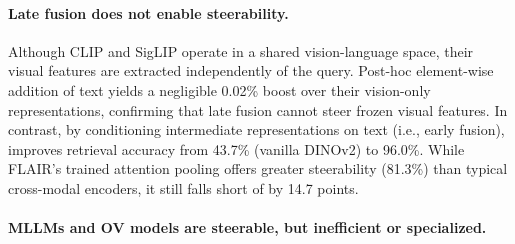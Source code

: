 \paragraph{Late fusion does not enable steerability.}
Although CLIP and SigLIP operate in a shared vision-language space, their visual features are extracted independently of the query. Post-hoc element-wise addition of text yields a negligible 0.02\% boost over their vision-only representations, confirming that late fusion cannot steer frozen visual features.
In contrast, by conditioning intermediate representations on text (i.e., early fusion), \model{} improves retrieval accuracy from 43.7\% (vanilla DINOv2) to 96.0\%.
While FLAIR's trained attention pooling offers greater steerability (81.3\%) than typical cross-modal encoders, it still falls short of \model{} by 14.7 points.


\paragraph{MLLMs and OV models are steerable, but inefficient or specialized.}

